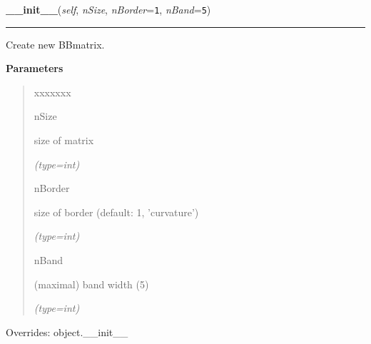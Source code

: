     \vspace{0.5ex}

\hspace{.8\funcindent}\begin{boxedminipage}{\funcwidth}

    \raggedright \textbf{\_\_init\_\_}(\textit{self}, \textit{nSize}, \textit{nBorder}={\tt 1}, \textit{nBand}={\tt 5})

    \vspace{-1.5ex}

    \rule{\textwidth}{0.5\fboxrule}
\setlength{\parskip}{2ex}
    Create new BBmatrix.

\setlength{\parskip}{1ex}
      \textbf{Parameters}
      \vspace{-1ex}

      \begin{quote}
        \begin{Ventry}{xxxxxxx}

          \item[nSize]

          size of matrix

            {\it (type=int)}

          \item[nBorder]

          size of border (default: 1, 'curvature')

            {\it (type=int)}

          \item[nBand]

          (maximal) band width (5)

            {\it (type=int)}

        \end{Ventry}

      \end{quote}

      Overrides: object.\_\_init\_\_

    \end{boxedminipage}

    \label{gblnum:BorderedBandMatrix:addBlockMatrix}

    \vspace{0.5ex}


